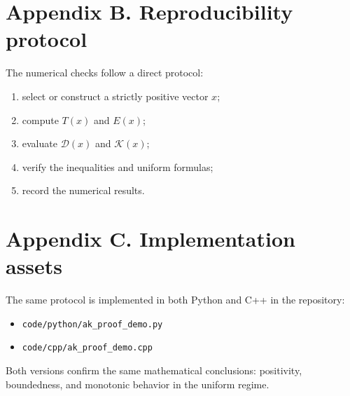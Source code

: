 \documentclass[11pt]{article}
\begin{document}
\section{Appendix B. Reproducibility protocol}
The numerical checks follow a direct protocol:
\begin{enumerate}[label=\arabic*.]
\item select or construct a strictly positive vector $x$;
\item compute $T(x)$ and $E(x)$;
\item evaluate $\mathcal{D}(x)$ and $\mathcal{K}(x)$;
\item verify the inequalities and uniform formulas;
\item record the numerical results.
\end{enumerate}

\section{Appendix C. Implementation assets}
The same protocol is implemented in both Python and C++ in the repository:
\begin{itemize}
\item \texttt{code/python/ak\_proof\_demo.py}
\item \texttt{code/cpp/ak\_proof\_demo.cpp}
\end{itemize}

Both versions confirm the same mathematical conclusions: positivity, boundedness, and monotonic behavior in the uniform regime.



\end{document}
